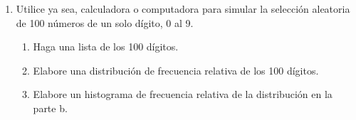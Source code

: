 \documentclass[10pt,twoside]{article}
\begin{document}
\begin{enumerate}
\begin{enumerate}
\end{enumerate}
\item Utilice ya sea, calculadora o computadora para simular la selección aleatoria de 100 números de un solo dígito, 0 al 9.
\begin{enumerate}
\item Haga una lista de los 100 dígitos.
\item Elabore una distribución de frecuencia relativa de los 100 dígitos.
\item Elabore un histograma de frecuencia relativa de la distribución en la parte b.
\end{enumerate}
\end{enumerate}
\end{document}
